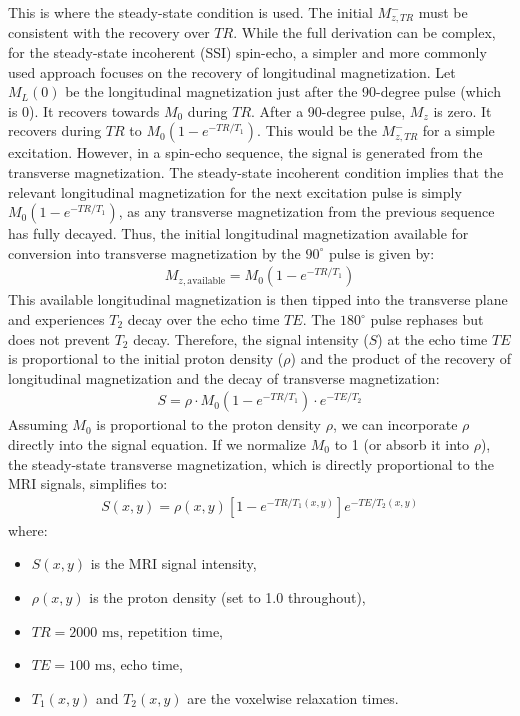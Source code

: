 \documentclass[10pt,a4paper,twoside]{article}
\begin{document}
This is where the steady-state condition is used. The initial $M_{z,TR}^-$ must be consistent with the recovery over $TR$.
While the full derivation can be complex, for the steady-state incoherent (SSI) spin-echo, a simpler and more commonly used approach focuses on the recovery of longitudinal magnetization.
Let $M_L(0)$ be the longitudinal magnetization just after the 90-degree pulse (which is 0). It recovers towards $M_0$ during $TR$.
After a 90-degree pulse, $M_z$ is zero. It recovers during $TR$ to $M_0(1-e^{-TR/T_1})$. This would be the $M_{z,TR}^-$ for a simple excitation.
However, in a spin-echo sequence, the signal is generated from the transverse magnetization. The steady-state incoherent condition implies that the relevant longitudinal magnetization for the next excitation pulse is simply $M_0(1-e^{-TR/T_1})$, as any transverse magnetization from the previous sequence has fully decayed.
Thus, the initial longitudinal magnetization available for conversion into transverse magnetization by the $90^\circ$ pulse is given by:
\begin{gather*}
M_{z,\text{available}} = M_0(1-e^{-TR/T_1})
\end{gather*}
This available longitudinal magnetization is then tipped into the transverse plane and experiences $T_2$ decay over the echo time $TE$. The $180^\circ$ pulse rephases but does not prevent $T_2$ decay.
Therefore, the signal intensity ($S$) at the echo time $TE$ is proportional to the initial proton density ($\rho$) and the product of the recovery of longitudinal magnetization and the decay of transverse magnetization:
\begin{gather*}
S = \rho \cdot M_0(1-e^{-TR/T_1}) \cdot e^{-TE/T_2}
\end{gather*}
Assuming $M_0$ is proportional to the proton density $\rho$, we can incorporate $\rho$ directly into the signal equation. If we normalize $M_0$ to 1 (or absorb it into $\rho$), the steady-state transverse magnetization, which is directly proportional to the MRI signals, simplifies to:
\begin{gather*}
    S(x, y) = \rho(x, y) \left[ 1 - e^{-TR / T_1(x, y)} \right] e^{-TE / T_2(x, y)} \tag{(1)}
\end{gather*}
where:
\begin{itemize}
    \item \(S(x, y)\) is the MRI signal intensity,
    \item \(\rho(x, y)\) is the proton density (set to 1.0 throughout),
    \item \(TR = 2000 \text{ ms}\), repetition time,
    \item \(TE = 100 \text{ ms}\), echo time,
    \item \(T_1(x, y)\) and \(T_2(x, y)\) are the voxelwise relaxation times.
\end{itemize}
\end{document}
